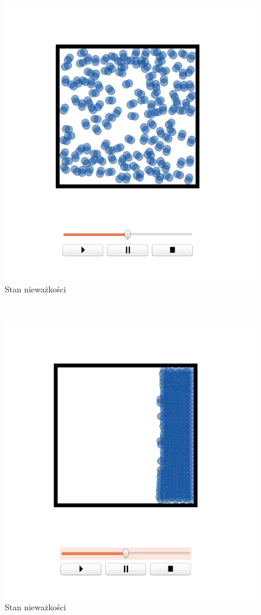 \begin{minipage}{0.5\textwidth}
\begin{figure}[H]
 \begin{center} 
  \includegraphics[width=\textwidth]{./rysunki/niewazkosc} 
 \end{center}
 \caption{Stan nieważkości}
 \label{fig:niewazkosc} 
\end{figure}
\end{minipage}
~
\begin{minipage}{0.5\textwidth}
\begin{figure}[H]
 \begin{center} 
  \includegraphics[width=\textwidth]{./rysunki/niewazkosc1} 
 \end{center}
 \caption{Stan nieważkości}
 \label{fig:niewazkosc_stabilny} 
\end{figure}
\end{minipage}\\[0.1cm]
